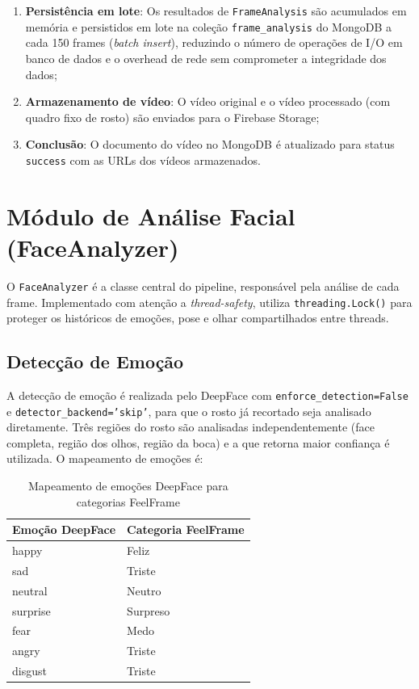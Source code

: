 \documentclass[
	12pt,
	openright,
	oneside,
	a4paper,
	english,
	brazil
	]{abntex2}
\begin{document}
\begin{enumerate}
    \item \textbf{Persistência em lote}: Os resultados de \texttt{FrameAnalysis} são acumulados em memória e persistidos em lote na coleção \texttt{frame\_analysis} do MongoDB a cada 150 frames (\textit{batch insert}), reduzindo o número de operações de I/O em banco de dados e o overhead de rede sem comprometer a integridade dos dados;
    \item \textbf{Armazenamento de vídeo}: O vídeo original e o vídeo processado (com quadro fixo de rosto) são enviados para o Firebase Storage;
    \item \textbf{Conclusão}: O documento do vídeo no MongoDB é atualizado para status \texttt{success} com as URLs dos vídeos armazenados.
\end{enumerate}

\section{Módulo de Análise Facial (FaceAnalyzer)}

O \texttt{FaceAnalyzer} é a classe central do pipeline, responsável pela análise de cada frame. Implementado com atenção a \textit{thread-safety}, utiliza \texttt{threading.Lock()} para proteger os históricos de emoções, pose e olhar compartilhados entre threads.

\subsection{Detecção de Emoção}

A detecção de emoção é realizada pelo DeepFace com \texttt{enforce\_detection=False} e \texttt{detector\_backend='skip'}, para que o rosto já recortado seja analisado diretamente. Três regiões do rosto são analisadas independentemente (face completa, região dos olhos, região da boca) e a que retorna maior confiança é utilizada. O mapeamento de emoções é:

\begin{table}[H]
\centering
\caption{Mapeamento de emoções DeepFace para categorias FeelFrame}
\label{tab:emocoes}
\begin{tabular}{|l|l|}
\hline
\textbf{Emoção DeepFace} & \textbf{Categoria FeelFrame} \\ \hline
happy                     & Feliz                        \\ \hline
sad                       & Triste                       \\ \hline
neutral                   & Neutro                       \\ \hline
surprise                  & Surpreso                     \\ \hline
fear                      & Medo                         \\ \hline
angry                     & Triste                       \\ \hline
disgust                   & Triste                       \\ \hline
\end{tabular}
\end{table}
\end{document}
